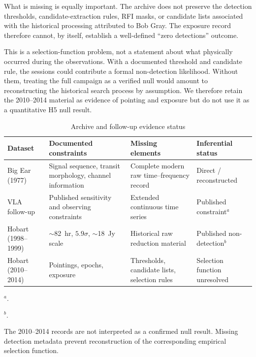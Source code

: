 \documentclass[crop]{CSL}
\begin{document}
What is missing is equally important. The archive does not preserve the detection thresholds, candidate-extraction rules, RFI masks, or candidate lists associated with the historical processing attributed to Bob Gray. The exposure record therefore cannot, by itself, establish a well-defined ``zero detections'' outcome.

This is a selection-function problem, not a statement about what physically occurred during the observations. With a documented threshold and candidate rule, the sessions could contribute a formal non-detection likelihood. Without them, treating the full campaign as a verified null would amount to reconstructing the historical search process by assumption. We therefore retain the 2010--2014 material as evidence of pointing and exposure but do not use it as a quantitative H5 null result.

\begin{table}[ht!]
\centering
\caption{Archive and follow-up evidence status}
\label{tab:archive_status}
\begin{tabular}{>{\raggedright\arraybackslash}p{}>{\raggedright\arraybackslash}p{}>{\raggedright\arraybackslash}p{}>{\raggedright\arraybackslash}p{}}
\hline Dataset & Documented constraints & Missing elements & Inferential status \\ \hline\hline
Big Ear (1977)
& Signal sequence, transit morphology, channel information
& Complete modern raw time--frequency record
& Direct / reconstructed\\
VLA follow-up
& Published sensitivity and observing constraints
& Extended continuous time series
& Published constraint$^{a}$\\
Hobart (1998--1999)
& $\sim$82~hr, $5.9\sigma$, $\sim$18~Jy scale
& Historical raw reduction material
& Published non-detection$^{b}$\\
Hobart (2010--2014)
& Pointings, epochs, exposure
& Thresholds, candidate lists, selection rules
& Selection function unresolved\\
\end{tabular}

\par $^{a}$\citet{gray2001}.

\par $^{b}$\citet{gray2002}.
\par {\small The 2010--2014 records are not interpreted as a confirmed null result. Missing detection metadata prevent reconstruction of the corresponding empirical selection function.}
\end{table}
\end{document}
